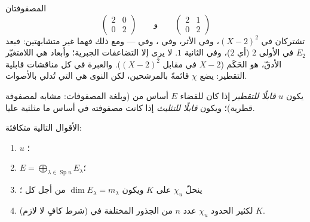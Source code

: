 \begin{example}\label{ex:b2:reduction:samechi}
المصفوفتان
\[
\begin{pmatrix}2 & 0\\ 0 & 2\end{pmatrix}
\qquad\text{و}\qquad
\begin{pmatrix}2 & 1\\ 0 & 2\end{pmatrix}
\]
تشتركان في  $(X - 2)^2$، وفي الأثر، وفي
، وفي  --- ومع ذلك فهما غير متشابهتين: فبعد $E_2$
في الأولى $2$ (أي  $2$)، وفي الثانية
$1$.  لا يرى إلا التضاعفات
الجبرية؛ وأبعاد  هي اللامتغيّر الأدقّ،
 هو الحَكَم ($X - 2$
في مقابل $(X - 2)^2$). والعبرة في كل مناقشات
قابلية التقطير: يضع $\chi$ قائمةً بالمرشحين، لكن النوى هي التي
تُدلي بالأصوات.
\end{example}

\begin{definition}\label{def:b2:reduction:diag}
يكون $u$ \emph{قابلًا للتقطير} إذا كان للفضاء $E$
أساس من  (وبلغة المصفوفات: مشابه لمصفوفة قطرية)؛
ويكون \emph{قابلًا للتثليث} إذا كانت مصفوفته في
أساس ما مثلثية عليا.
\end{definition}

\begin{theorem}\label{thm:b2:reduction:diagcrit}
الأقوال التالية متكافئة:
\begin{enumerate}
  \item $u$ ؛
  \item $E = \bigoplus_{\lambda \in \operatorname{Sp} u} E_\lambda$؛
  \item ينحلّ $\chi_u$ على $K$ ويكون $\dim E_\lambda = m_\lambda$
        من أجل كل ؛
  \item (شرط كافٍ لا لازم) لكثير الحدود $\chi_u$ عدد $n$ من الجذور المختلفة
        في $K$.
\end{enumerate}
\end{theorem}

